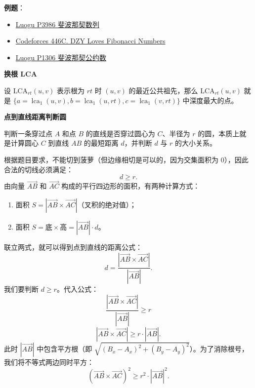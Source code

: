 \textbf{例题}：
\begin{itemize}
  \item \href{https://www.luogu.com.cn/problem/P3986}{Luogu P3986 斐波那契数列}
  \item \href{https://codeforces.com/problemset/problem/446/C}{Codeforces 446C. DZY Loves Fibonacci Numbers}
  \item \href{https://www.luogu.com.cn/problem/P1306}{Luogu P1306 斐波那契公约数}
\end{itemize}

\par\medskip\noindent\textbf{换根 LCA}\par\smallskip
设 $\mathrm{LCA}_{rt}(u,v)$ 表示根为 $rt$ 时 $(u,v)$ 的最近公共祖先，那么 $\mathrm{LCA}_{rt}(u,v)$ 就是 $\{a=\operatorname{lca}_1(u,v),b=\operatorname{lca}_1(u,rt),c=\operatorname{lca}_1(v,rt)\}$ 中深度最大的点。

\par\medskip\noindent\textbf{点到直线距离判断圆}\par\smallskip
判断一条穿过点 $A$ 和点 $B$ 的直线是否穿过圆心为 $C$、半径为 $r$ 的圆，本质上就是计算圆心 $C$ 到直线 $AB$ 的最短距离 $d$，并判断 $d$ 与 $r$ 的大小关系。

根据题目要求，不能切到菠萝（但边缘相切是可以的，因为交集面积为 $0$），因此合法的切线必须满足：
\[
d \ge r.
\]
由向量 $\vec{AB}$ 和 $\vec{AC}$ 构成的平行四边形的面积，有两种计算方式：
\begin{enumerate}
  \item 面积 $S=|\vec{AB}\times\vec{AC}|$（叉积的绝对值）；
  \item 面积 $S=\text{底}\times\text{高}=|\vec{AB}|\cdot d$。
\end{enumerate}
联立两式，就可以得到点到直线的距离公式：
\[
d=\frac{|\vec{AB}\times\vec{AC}|}{|\vec{AB}|}.
\]
我们要判断 $d\ge r$。代入公式：
\[
\frac{|\vec{AB}\times\vec{AC}|}{|\vec{AB}|}\ge r
\]
\[
|\vec{AB}\times\vec{AC}|\ge r\cdot|\vec{AB}|.
\]
此时 $|\vec{AB}|$ 中包含平方根（即 $\sqrt{(B_x-A_x)^2+(B_y-A_y)^2}$）。为了消除根号，我们将不等式两边同时平方：
\[
(\vec{AB}\times\vec{AC})^2\ge r^2\cdot|\vec{AB}|^2.
\]

